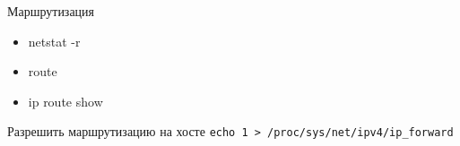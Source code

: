 \begin{frame}{Маршрутизация}
	\begin{itemize}
		\item netstat -r
		\item route
		\item ip route show
	\end{itemize}

	\begin{block}{Разрешить маршрутизацию на хосте}
		{\tt echo 1 > /proc/sys/net/ipv4/ip\_forward}
	\end{block}
\end{frame}


